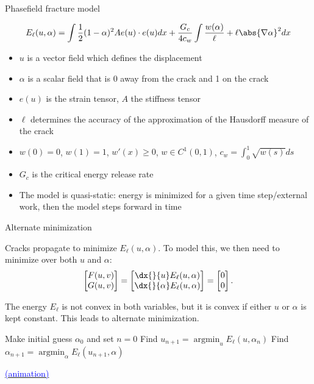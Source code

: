 \documentclass[10pt]{beamer}
\DeclareMathOperator{\argmin}{argmin}
\begin{document}
\begin{frame}{Phasefield fracture model}

\begin{equation*}
	E_\ell(u,\alpha) = \int \frac{1}{2} (1 - \alpha)^2 A e(u) \cdot e(u) dx + \frac{G_c}{4 c_w} \int \frac{w(\alpha)}{\ell} + \ell \abs{\nabla \alpha}^2 dx
\end{equation*}
\begin{itemize}
\item $u$ is a vector field which defines the displacement
\item $\alpha$ is a scalar field that is 0 away from the crack and 1 on the crack
\item $e(u)$ is the strain tensor, $A$ the stiffness tensor
\item $\ell$ determines the accuracy of the approximation of the Hausdorff measure of the crack
\item $w(0)=0$, $w(1)=1$, $w'(x) \geq 0$, $w \in C^1(0,1)$, $c_w = \int_0^1 \sqrt{w(s)} ds$
\item $G_c$ is the critical energy release rate
\item The model is quasi-static: energy is minimized for a given time step/external work, then the model steps forward in time
\end{itemize}
\end{frame}

\begin{frame}{Alternate minimization}

Cracks propagate to minimize $E_\ell(u,\alpha)$.
To model this, we then need to minimize over both $u$ and $\alpha$:
\begin{equation*}
	\begin{bmatrix} F(u,v) \\ G(u,v) \end{bmatrix} = \begin{bmatrix} \dx{}{u} E_\ell(u,\alpha) \\ \dx{}{\alpha} E_\ell(u,\alpha) \end{bmatrix} = \begin{bmatrix} 0 \\ 0 \end{bmatrix}.
\end{equation*}

The energy $E_\ell$ is not convex in both variables, but it is convex if either $u$ or $\alpha$ is kept constant.
This leads to alternate minimization.
\begin{algorithm}[H]
	\caption{Alternate Minimization (AltMin)}
	\begin{algorithmic}[1]
		\State Make initial guess $\alpha_0$ and set $n=0$
			\State Find $u_{n+1} = \argmin_u E_\ell(u, \alpha_n)$
			\State Find $\alpha_{n+1} = \argmin_\alpha E_\ell(u_{n+1},\alpha)$
		\EndWhile
	\end{algorithmic}
\end{algorithm}
\href{PLOT_GD_AltMinAnimation.mp4}{\textcolor{blue}{(animation)}}
\end{frame}
\end{document}
